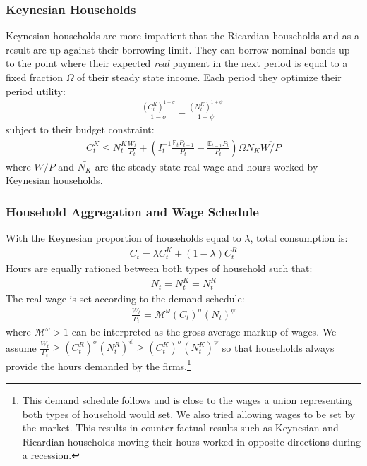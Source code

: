 \documentclass[titlepage]{\econtex}\newcommand{\texname}{ConsumptionHeterogeneity}
\begin{document}
\subsubsection{Keynesian Households}
Keynesian households are more impatient that the Ricardian households and as a result are up against their borrowing limit. They can borrow nominal bonds up to the point where their expected \textit{real} payment in the next period is equal to a fixed fraction $\Omega$ of their steady state income. Each period they optimize their period utility:
\begin{align*}
\frac{\left(C^K_t\right)^{1-\sigma}}{1-\sigma} - \frac{\left(N^K_t\right)^{1+\psi}}{1+\psi}\
\end{align*}
subject to their budget constraint:
\begin{align}
C^K_t \leq N^K_t \frac{W_t}{P_t} + \left(I_{t}^{-1} \frac{\mathbb{E}_t P_{t+1}}{P_t} -  \frac{\mathbb{E}_{t-1}P_t }{P_t}\right)\Omega \bar{N_K}\overline{W/P}  \label{budget_constraint_K}
\end{align}
where $\overline{W/P}$ and $\bar{N_K}$ are the steady state real wage and hours worked by Keynesian households.


\subsubsection{Household Aggregation and Wage Schedule}
With the Keynesian proportion of households equal to $\lambda$, total consumption is:
\begin{align}
C_t = \lambda C^K_t + (1-\lambda) C^R_t \label{agg_C}
\end{align}
Hours are equally rationed between both types of household such that:
\begin{align}
N_t = N^K_t = N^R_t	\label{agg_N}
\end{align}
The real wage is set according to the demand schedule:
\begin{align}
\frac{W_t}{P_t} = \mathcal{M}^{\omega} \left(C_t\right)^{\sigma}\left(N_t\right)^{\psi} \label{foc_hours}
\end{align}
where $\mathcal{M}^{\omega}>1$ can be interpreted as the gross average markup of wages. We assume $\frac{W_t}{P_t} \geq \left(C^R_t\right)^{\sigma}\left(N^R_t\right)^{\psi} \geq \left(C^K_t\right)^{\sigma}\left(N^K_t\right)^{\psi}$ so that households always provide the hours demanded by the firms.\footnote{This demand schedule follows \cite{dgHANKTANK} and is close to the wages a union representing both types of household would set. We also tried allowing wages to be set by the market. This results in counter-factual results such as Keynesian and Ricardian households moving their hours worked in opposite directions during a recession.}
\end{document}
